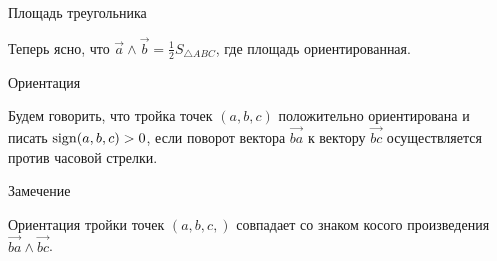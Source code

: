 \documentclass[12pt,aspectratio=169,svgnames]{beamer}
\begin{document}
\begin{frame}{Площадь треугольника}

	Теперь ясно, что $\vec{a} \wedge \vec{b} = \frac{1}{2} S_{\triangle{ABC}}$, где площадь \alert{ориентированная}.

	\begin{center}

	\end{center}

\end{frame}
\begin{frame}{Ориентация}

	\begin{defn}

		Будем говорить, что тройка точек $(a, b, c)$ \alert{положительно ориентирована} и писать $\operatorname{sign}(a, b, c) > 0$, если поворот вектора
		$\vec{ba}$ к вектору $\vec{bc}$ осуществляется против часовой стрелки.

	\end{defn}

	\begin{block}{Замечение}

		Ориентация тройки точек $(a, b, c,)$ совпадает со знаком косого произведения $\vec{ba} \wedge \vec{bc}$.

	\end{block}
\end{frame}
\end{document}

